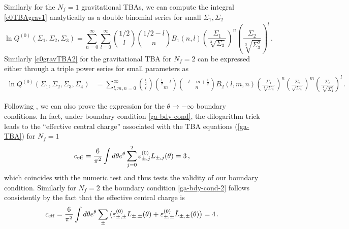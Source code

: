 \documentclass[11pt,a4paper]{elsarticle}
\def \ve {\varepsilon}
\def \ba {\begin{aligned}}
\def \ea {\end{aligned}}
\newcommand{\be}{\begin{equation}}
\newcommand{\ee}{\end{equation}}
\numberwithin{figure}{section}
\numberwithin{table}{section}
\begin{document}
Similarly for the $N_f=1$ gravitational TBAs, we can compute the integral \eqref{c0TBAgrav1} analytically as a double binomial series for small $\Sigma_1, \Sigma_2$
\be
\ln Q^{(0)}( \Sigma_1, \Sigma_2,\Sigma_3)%
=\sum_{n=0}^{\infty}\sum_{l=0}^{\infty}\binom{1/2}{l}\binom{1/2-l}{n}B_1(n,l)\left(\frac{\Sigma_1}{\sqrt[3]{\Sigma_3}} \right)^{n}\left(\frac{\Sigma_2}{\sqrt[3]{\Sigma_3^2}}\right)^{l}\,.
\ee
Similarly \eqref{c0gravTBA2} for the gravitational TBA for $N_f=2$ can be expressed either through a triple power series for small parameters as 
\be
\ba 
\ln Q^{(0)}(\Sigma_1,\Sigma_2,\Sigma_3,\Sigma_4)%
&= \sum_{l,m,n=0}^\infty \binom{\frac{1}{2}}{l} \binom{\frac{1}{2}-l}{m} \binom{-l-m+\frac{1}{2}}{n} B_2(l,m,n) \left(\frac{\Sigma_1}{\sqrt[4]{\Sigma_4}}\right)^n \left(\frac{\Sigma_2}{\sqrt{\Sigma_4}}\right)^m \left(\frac{\Sigma_3}{\sqrt[4]{\Sigma_4^3}}\right)^l \,.%
\ea 
\ee


Following \cite{ItoMarinoShu:2018,GrassiGuMarino}, we can also prove the expression for the $\theta \to - \infty$ boundary conditions. In fact, under boundary condition \eqref{ga-bdy-cond}, the  dilogarithm trick leads to the ``effective central charge'' associated with the TBA equations (\ref{ga-TBA}) for $N_f=1$
\be
\label{ceff}
c_{\rm eff}=\frac{6}{\pi^2}\int d\theta e^\theta \sum_{j=0}^2\ve^{(0)}_{\pm,j} L_{\pm,j}(\theta)=3\,,
\ee
which coincides with the numeric test and thus tests the validity of our boundary condition. Similarly for $N_f=2$ the boundary condition \eqref{ga-bdy-cond-2} follows consistently by the fact that the effective central charge is 
\be
\label{ceff2}
c_{\rm eff}=\frac{6}{\pi^2}\int d\theta e^\theta \sum_{\pm } \big(\varepsilon^{(0)}_{\pm,\pm} L_{\pm,\pm}(\theta)+ \bar{\varepsilon}_{\pm,\pm}^{(0)} \bar{L}_{\pm,\pm}(\theta)\big)=4\,.
\ee
\end{document}

